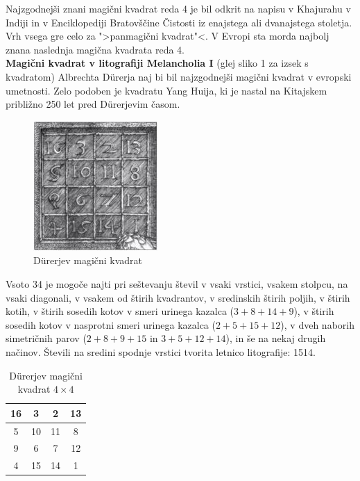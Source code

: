\documentclass[a4paper,12pt]{article}
\begin{document}
Najzgodnejši znani magični kvadrat reda 4 je bil odkrit na napisu
v Khajurahu v Indiji in v Enciklopediji Bratovščine Čistosti iz enajstega
ali dvanajstega stoletja. Vrh vsega gre celo za ">panmagični kvadrat"<.
V Evropi sta morda najbolj znana naslednja magična kvadrata reda 4.
\\[1em]
\textbf{Magični kvadrat v litografiji Melancholia I} (glej sliko 1
za izsek s kvadratom) Albrechta Dürerja naj bi bil najzgodnejši magični kvadrat
v evropski umetnosti. Zelo podoben je kvadratu Yang Huija, ki je nastal na Kitajskem
približno 250 let pred Dürerjevim časom. %
\begin{figure}[H]
   \centering
   \caption{Dürerjev magični kvadrat}
   \label{fig:durer}
   \includegraphics[scale=1.5]{durer.png}
\end{figure}
Vsoto 34 je mogoče najti pri seštevanju števil v vsaki vrstici, vsakem stolpcu,
na vsaki diagonali, v vsakem od štirih kvadrantov, v sredinskih štirih poljih,
v štirih kotih, v štirih sosedih kotov v smeri urinega kazalca ($3+8+14+9$), v
štirih sosedih kotov v nasprotni smeri urinega kazalca ($2+5+15+12$), v dveh naborih
simetričnih parov ($2+8+9+15$ in $3+5+12+14$), in še na nekaj drugih načinov.
Števili na sredini spodnje vrstici tvorita letnico litografije: 1514.
%
\begin{table}[h]
   \centering
   \caption{Dürerjev magični kvadrat $4 \times 4$}
   \label{table:durer}
   \begin{tabular}{|c|c|c|c|}
   \hline
     16 &  3 &  2 & 13 \\\hline
      5 & 10 & 11 &  8 \\\hline
      9 &  6 &  7 & 12 \\\hline
      4 & 15 & 14 &  1 \\\hline
   \end{tabular}
   \end{table}
\end{document}
